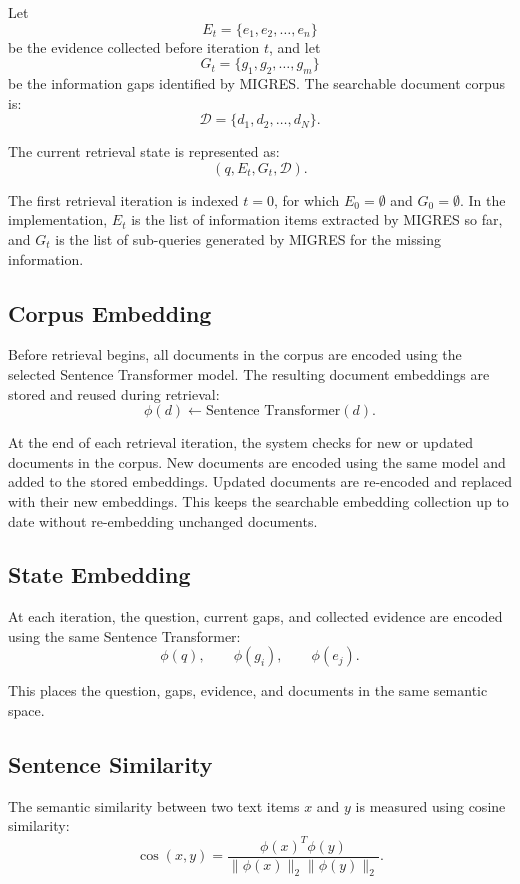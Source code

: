 \documentclass[12pt,a4paper]{report}
\begin{document}
Let
\[
E_t=\{e_1,e_2,\ldots,e_n\}
\]
be the evidence collected before iteration $t$, and let
\[
G_t=\{g_1,g_2,\ldots,g_m\}
\]
be the information gaps identified by MIGRES. The searchable document corpus is:
\[
\mathcal{D}=\{d_1,d_2,\ldots,d_N\}.
\]

The current retrieval state is represented as:
\[
\boxed{(q,E_t,G_t,\mathcal{D})}.
\]

The first retrieval iteration is indexed $t=0$, for which $E_0=\emptyset$ and $G_0=\emptyset$. In the implementation, $E_t$ is the list of information items extracted by MIGRES so far, and $G_t$ is the list of sub-queries generated by MIGRES for the missing information.

\subsection{Corpus Embedding}

Before retrieval begins, all documents in the corpus are encoded using the selected Sentence Transformer model. The resulting document embeddings are stored and reused during retrieval:
\[
\phi(d) \leftarrow \text{Sentence Transformer}(d).
\]

At the end of each retrieval iteration, the system checks for new or updated documents in the corpus. New documents are encoded using the same model and added to the stored embeddings. Updated documents are re-encoded and replaced with their new embeddings. This keeps the searchable embedding collection up to date without re-embedding unchanged documents.

\subsection{State Embedding}

At each iteration, the question, current gaps, and collected evidence are encoded using the same Sentence Transformer:
\[
\phi(q),\qquad \phi(g_i),\qquad \phi(e_j).
\]

This places the question, gaps, evidence, and documents in the same semantic space.

\subsection{Sentence Similarity}

The semantic similarity between two text items $x$ and $y$ is measured using cosine similarity:
\[
\operatorname{cos}(x,y)=
\frac{\phi(x)^T\phi(y)}{\|\phi(x)\|_2\|\phi(y)\|_2}.
\]
\end{document}
